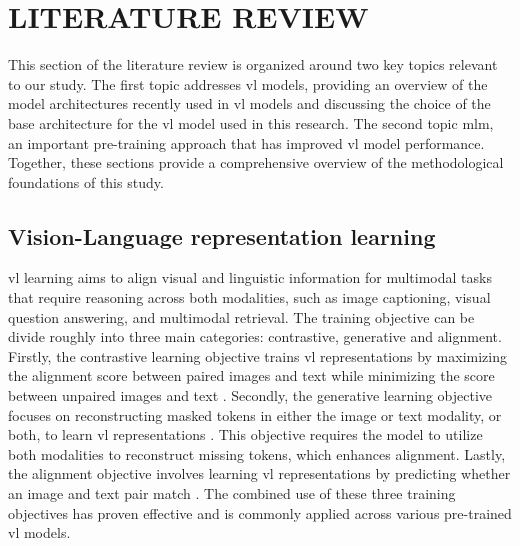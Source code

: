 \chapter{LITERATURE REVIEW}
This section of the literature review is organized around two key topics relevant to our study.
The first topic addresses \acrshort{vl} models, providing an overview of the model architectures recently used in \acrshort{vl} models and discussing the choice of the base architecture for the \acrshort{vl} model used in this research.
The second topic \acrshort{mlm}, an important pre-training approach that has improved \acrshort{vl} model performance.
Together, these sections provide a comprehensive overview of the methodological foundations of this study.

\section{Vision-Language representation learning}
\Acrshort{vl} learning aims to align visual and linguistic information for multimodal tasks that require reasoning across both modalities, such as image captioning, visual question answering, and multimodal retrieval. 
The training objective can be divide roughly into three main categories: contrastive, generative and alignment.
Firstly, the contrastive learning objective trains \acrshort{vl} representations by maximizing the alignment score between paired images and text while minimizing the score between unpaired images and text \cite{clip, align, unicl}. 
Secondly, the generative learning objective focuses on reconstructing masked tokens in either the image or text modality, or both, to learn \acrshort{vl} representations \cite{flava, albef, flamingo}. 
This objective requires the model to utilize both modalities to reconstruct missing tokens, which enhances alignment. 
Lastly, the alignment objective involves learning \acrshort{vl} representations by predicting whether an image and text pair match \cite{vlmo}. 
The combined use of these three training objectives has proven effective and is commonly applied across various pre-trained \acrshort{vl} models.

